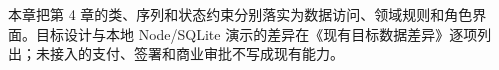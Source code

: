 \noindent 本章把第 4 章的类、序列和状态约束分别落实为数据访问、领域规则和角色界面。目标设计与本地 Node/SQLite 演示的差异在《现有目标数据差异》逐项列出；未接入的支付、签署和商业审批不写成现有能力。





